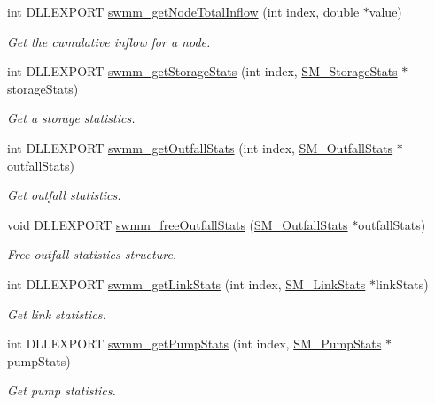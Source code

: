 \begin{DoxyCompactItemize}
int D\+L\+L\+E\+X\+P\+O\+RT \mbox{\hyperlink{group__tkfuncs_gab5d65643b9dddba000e2ae1f62ec3c59}{swmm\+\_\+get\+Node\+Total\+Inflow}} (int index, double $\ast$value)
\begin{DoxyCompactList}\small\item\em Get the cumulative inflow for a node. \end{DoxyCompactList}\item 
int D\+L\+L\+E\+X\+P\+O\+RT \mbox{\hyperlink{group__tkfuncs_gaec84d7c193dff925aa02505b0977868d}{swmm\+\_\+get\+Storage\+Stats}} (int index, \mbox{\hyperlink{struct_s_m___storage_stats}{S\+M\+\_\+\+Storage\+Stats}} $\ast$storage\+Stats)
\begin{DoxyCompactList}\small\item\em Get a storage statistics. \end{DoxyCompactList}\item 
int D\+L\+L\+E\+X\+P\+O\+RT \mbox{\hyperlink{group__tkfuncs_ga290977608917eaf93fa259aeb080880a}{swmm\+\_\+get\+Outfall\+Stats}} (int index, \mbox{\hyperlink{struct_s_m___outfall_stats}{S\+M\+\_\+\+Outfall\+Stats}} $\ast$outfall\+Stats)
\begin{DoxyCompactList}\small\item\em Get outfall statistics. \end{DoxyCompactList}\item 
void D\+L\+L\+E\+X\+P\+O\+RT \mbox{\hyperlink{group__tkfuncs_ga24874b7dc37c161521f0c14899c2157d}{swmm\+\_\+free\+Outfall\+Stats}} (\mbox{\hyperlink{struct_s_m___outfall_stats}{S\+M\+\_\+\+Outfall\+Stats}} $\ast$outfall\+Stats)
\begin{DoxyCompactList}\small\item\em Free outfall statistics structure. \end{DoxyCompactList}\item 
int D\+L\+L\+E\+X\+P\+O\+RT \mbox{\hyperlink{group__tkfuncs_ga4895dbf445e9abd6d7e9eb72515c49e0}{swmm\+\_\+get\+Link\+Stats}} (int index, \mbox{\hyperlink{struct_s_m___link_stats}{S\+M\+\_\+\+Link\+Stats}} $\ast$link\+Stats)
\begin{DoxyCompactList}\small\item\em Get link statistics. \end{DoxyCompactList}\item 
int D\+L\+L\+E\+X\+P\+O\+RT \mbox{\hyperlink{group__tkfuncs_gafb2a5a295fb4a038edb2a36eab8c576d}{swmm\+\_\+get\+Pump\+Stats}} (int index, \mbox{\hyperlink{struct_s_m___pump_stats}{S\+M\+\_\+\+Pump\+Stats}} $\ast$pump\+Stats)
\begin{DoxyCompactList}\small\item\em Get pump statistics. \end{DoxyCompactList}\item 

\end{DoxyCompactItemize}
